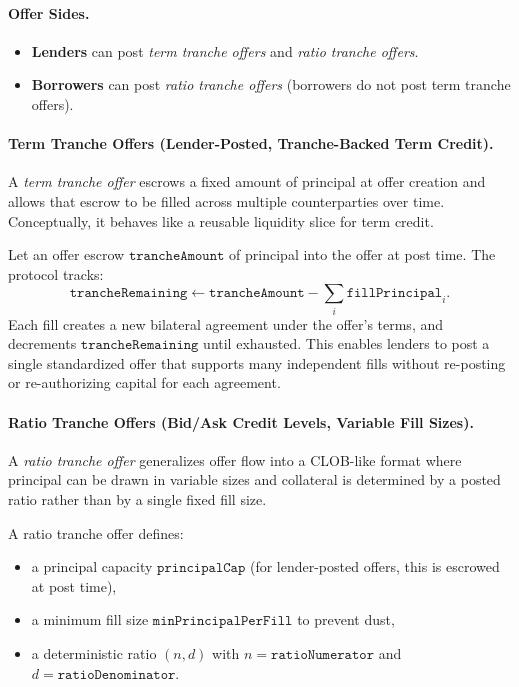 \documentclass[version=preprint]{iacrcc}
\begin{document}
\paragraph{Offer Sides.}
\begin{itemize}
  \item \textbf{Lenders} can post \textit{term tranche offers} and \textit{ratio tranche offers}.
  \item \textbf{Borrowers} can post \textit{ratio tranche offers} (borrowers do not post term tranche offers).
\end{itemize}

\paragraph{Term Tranche Offers (Lender-Posted, Tranche-Backed Term Credit).}
A \textit{term tranche offer} escrows a fixed amount of principal at offer creation and allows that escrow to be filled across multiple counterparties over time. Conceptually, it behaves like a reusable liquidity slice for term credit.

Let an offer escrow $\texttt{trancheAmount}$ of principal into the offer at post time. The protocol tracks:
\[
\texttt{trancheRemaining} \leftarrow \texttt{trancheAmount} - \sum_i \texttt{fillPrincipal}_i.
\]
Each fill creates a new bilateral agreement under the offer's terms, and decrements $\texttt{trancheRemaining}$ until exhausted. This enables lenders to post a single standardized offer that supports many independent fills without re-posting or re-authorizing capital for each agreement.

\paragraph{Ratio Tranche Offers (Bid/Ask Credit Levels, Variable Fill Sizes).}
A \textit{ratio tranche offer} generalizes offer flow into a CLOB-like format where principal can be drawn in variable sizes and collateral is determined by a posted ratio rather than by a single fixed fill size.

A ratio tranche offer defines:
\begin{itemize}
  \item a principal capacity $\texttt{principalCap}$ (for lender-posted offers, this is escrowed at post time),
  \item a minimum fill size $\texttt{minPrincipalPerFill}$ to prevent dust,
  \item a deterministic ratio $(n, d)$ with $n=\texttt{ratioNumerator}$ and $d=\texttt{ratioDenominator}$.
\end{itemize}
\end{document}
